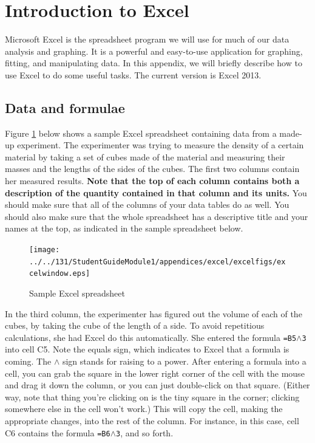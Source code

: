 
\section{Introduction to Excel}

Microsoft Excel is the spreadsheet program we will use for much of our
data analysis and graphing.  It is a powerful and easy-to-use
application for graphing, fitting, and manipulating data. In this
appendix, we will briefly describe how to use Excel to do some useful
tasks.  The current version is Excel 2013.

\subsection{Data and formulae}

Figure \ref{fig:excel} below shows a sample Excel spreadsheet containing data
from a made-up experiment.  The experimenter was trying to measure
the density of a certain material by taking a set of cubes
made of the material and measuring their masses and the lengths of
the sides of the cubes.  The first two columns contain her measured
results.  \textbf{Note that the top of each column contains both
a description of the quantity contained in that column and its units.}
You should make sure that all of the columns of your data tables do as well.
You should also make sure that the whole spreadsheet has a descriptive
title and your names at the top, as indicated in the sample spreadsheet 
below.

\begin{figure}[b!]
\centerline{\texttt{[image: ../../131/StudentGuideModule1/appendices/excel/excelfigs/excelwindow.eps]}}
\caption{Sample Excel spreadsheet}
\label{fig:excel}
\end{figure}

In the third column, the experimenter has figured out the volume
of each of the cubes, by taking the cube of the length of a side.
To avoid repetitious calculations, she had Excel do this automatically.
She entered the formula {\tt =B5$\wedge$3}  into cell C5.
Note the equals sign, which indicates to Excel that a formula is coming.
The $\wedge$ sign stands for raising to a power.  After entering a formula
into a cell, you can grab the square in the lower right corner of the
cell with the mouse and drag it down the column, or you can just double-click
on that square.  (Either way, note that thing you're clicking on is
the tiny square in the corner; clicking somewhere else in the cell won't work.)
This will copy
the cell, making the appropriate changes, into the rest of the column.
For instance, in this case, cell C6 contains the formula {\tt =B6$\wedge$3},
and so forth.

